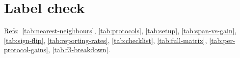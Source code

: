 \documentclass[10pt,twocolumn]{article}
\begin{document}











\section*{Label check}
Refs:~\ref{tab:nearest-neighbours}, \ref{tab:protocols}, \ref{tab:setup},
\ref{tab:span-vs-gain}, \ref{tab:sign-flip}, \ref{tab:reporting-rates},
\ref{tab:checklist}, \ref{tab:full-matrix}, \ref{tab:per-protocol-gains},
\ref{tab:f3-breakdown}.
\end{document}
